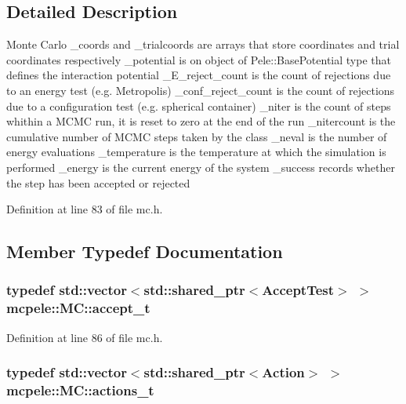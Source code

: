 \subsection{\-Detailed \-Description}
\-Monte \-Carlo \-\_\-coords and \-\_\-trialcoords are arrays that store coordinates and trial coordinates respectively \-\_\-potential is on object of \-Pele\-::\-Base\-Potential type that defines the interaction potential \-\_\-\-E\-\_\-reject\-\_\-count is the count of rejections due to an energy test (e.\-g. \-Metropolis) \-\_\-conf\-\_\-reject\-\_\-count is the count of rejections due to a configuration test (e.\-g. spherical container) \-\_\-niter is the count of steps whithin a \-M\-C\-M\-C run, it is reset to zero at the end of the run \-\_\-nitercount is the cumulative number of \-M\-C\-M\-C steps taken by the class \-\_\-neval is the number of energy evaluations \-\_\-temperature is the temperature at which the simulation is performed \-\_\-energy is the current energy of the system \-\_\-success records whether the step has been accepted or rejected 

\-Definition at line 83 of file mc.\-h.



\subsection{\-Member \-Typedef \-Documentation}
\hypertarget{classmcpele_1_1MC_ab52ae82dba8e7299583f48a382f8bd5a}{
\subsubsection[{accept\-\_\-t}]{\setlength{\rightskip}{0pt plus 5cm}typedef std\-::vector$<$std\-::shared\-\_\-ptr$<${\bf \-Accept\-Test}$>$ $>$ {\bf mcpele\-::\-M\-C\-::accept\-\_\-t}}}\label{classmcpele_1_1MC_ab52ae82dba8e7299583f48a382f8bd5a}


\-Definition at line 86 of file mc.\-h.

\hypertarget{classmcpele_1_1MC_a6b0a924bb76c28b6fc25c66675c1dcf9}{
\subsubsection[{actions\-\_\-t}]{\setlength{\rightskip}{0pt plus 5cm}typedef std\-::vector$<$std\-::shared\-\_\-ptr$<${\bf \-Action}$>$ $>$ {\bf mcpele\-::\-M\-C\-::actions\-\_\-t}}}\label{classmcpele_1_1MC_a6b0a924bb76c28b6fc25c66675c1dcf9}


